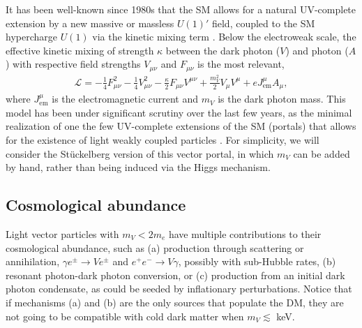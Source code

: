 \documentclass[prd,reprint,nofootinbib,notitlepage,aps,tightenlines,preprintnumbers,amsmath,amssymb,showpacs,superscriptaddress]{revtex4-1}
\begin{document}
It has been well-known since 1980s that the SM allows for a natural UV-complete
extension by a new massive or massless $U(1)'$ field, coupled to the
SM hypercharge $U(1)$ via the kinetic mixing term
\cite{Holdom:1985ag}. Below the electroweak scale, the effective
kinetic mixing of strength $\kappa$ between the dark photon ($V$) and
photon ($A$) with respective field strengths $V_{\mu\nu}$ and
$F_{\mu\nu}$ is the most relevant,
%
\begin{align}
  \label{eq:L}
  \mathcal{L} = -\frac{1}{4} F_{\mu\nu}^2-\frac{1}{4} V_{\mu\nu}^2 -
  \frac{\kappa}{2} F_{\mu\nu}V^{\mu\nu} + \frac{m_V^2}{2} V_{\mu}V^{\mu}
  + e J_{\mathrm{em}}^{\mu} A_{\mu},
\end{align}
%
where $ J_{\mathrm{em}}^{\mu} $ is the electromagnetic current and
$m_V$ is the dark photon mass.
%
This model has been under significant scrutiny over the last few
years, as the minimal realization of one the few UV-complete extensions of the SM
(portals) that allows for the existence of light weakly coupled particles
\cite{Essig:2013lka}.  For simplicity, we will consider the
St\"uckelberg version of this vector portal, in which $m_V$ can be
added by hand, rather than being induced via the Higgs mechanism.



\subsection{Cosmological abundance}
\label{sec:cosm-abund}



Light vector particles with $m_V < 2 m_e$ have multiple
contributions to their cosmological abundance, such as (a) production
through scattering or annihilation, $\gamma e^{\pm}\to V e^{\pm}$ and
$e^+e^-\to V\gamma$, possibly with sub-Hubble rates, (b) resonant
photon-dark photon conversion, or (c) production from an initial dark
photon condensate, as could be seeded by inflationary
perturbations. Notice that if mechanisms (a) and (b) are the only
sources that populate the DM, they are not going to be compatible with
cold dark matter when $m_V \lesssim$ keV.
\end{document}
